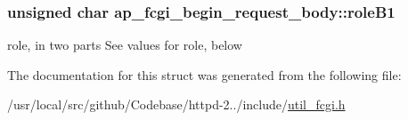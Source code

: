 \subsubsection[{\texorpdfstring{role\+B1}{roleB1}}]{\setlength{\rightskip}{0pt plus 5cm}unsigned char ap\+\_\+fcgi\+\_\+begin\+\_\+request\+\_\+body\+::role\+B1}\hypertarget{structap__fcgi__begin__request__body_ad3a706ede9a2f1780027a8b0cf30025e}{}\label{structap__fcgi__begin__request__body_ad3a706ede9a2f1780027a8b0cf30025e}
role, in two parts See values for role, below 

The documentation for this struct was generated from the following file\+:\begin{DoxyCompactItemize}
\item 
/usr/local/src/github/\+Codebase/httpd-\/2../include/\hyperlink{util__fcgi_8h}{util\+\_\+fcgi.\+h}\end{DoxyCompactItemize}
